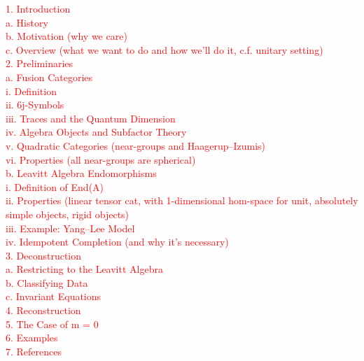 \noindent\textcolor{red}{1. Introduction\\
	a. History\\
	b. Motivation (why we care)\\
	c. Overview (what we want to do and how we'll do it, c.f. unitary setting)\\
2. Preliminaries\\
	a. Fusion Categories\\
		i.   Definition\\
		ii.  6j-Symbols\\
		iii. Traces and the Quantum Dimension\\
		iv.  Algebra Objects and Subfactor Theory\\
		v.   Quadratic Categories (near-groups and Haagerup--Izumis)\\
		vi.  Properties (all near-groups are spherical)\\
	b. Leavitt Algebra Endomorphisms\\
		i.   Definition of End(A)\\
		ii.  Properties (linear tensor cat, with 1-dimensional hom-space for unit, absolutely simple objects, rigid objects)\\
		iii. Example: Yang--Lee Model\\
		iv.  Idempotent Completion (and why it's necessary)\\
3. Deconstruction\\
	a. Restricting to the Leavitt Algebra\\
	b. Classifying Data\\
	c. Invariant Equations\\
4. Reconstruction\\
5. The Case of m = 0\\
6. Examples\\
7. References
}\newpage

